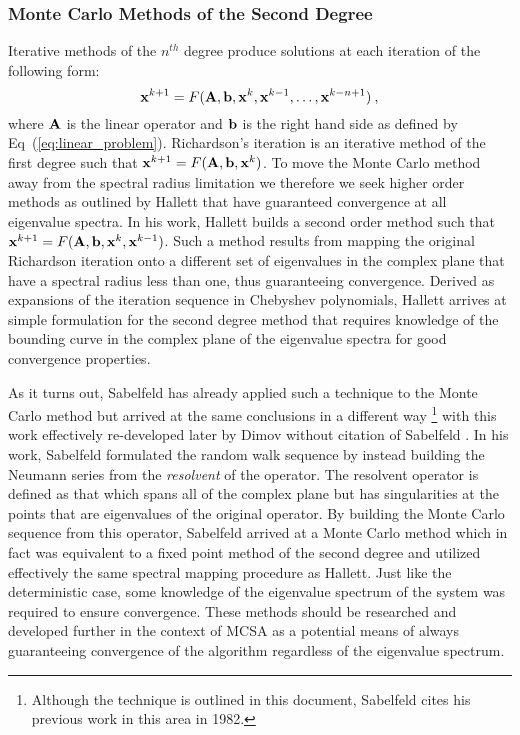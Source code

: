 \subsubsection{Monte Carlo Methods of the Second Degree}
\label{subsubsec:2_degree_mc}

Iterative methods of the $n^{th}$ degree produce solutions at each
iteration of the following form:
\begin{equation}
  \mathbf{x}^{k+1} = F(\mathbf{A},\mathbf{b},\mathbf{x}^{k},\mathbf{x}^{k-1},\dots,\mathbf{x}^{k-n+1})\:,
\label{eq:nth_degree_iter}
\end{equation}
where $\mathbf{A}$ is the linear operator and $\mathbf{b}$ is the right hand
side as defined by Eq~(\ref{eq:linear_problem}). Richardson's
iteration is an iterative method of the first degree such that
$\mathbf{x}^{k+1} = F(\mathbf{A},\mathbf{b},\mathbf{x}^{k})$. To move the Monte Carlo
method away from the spectral radius limitation we therefore we seek
higher order methods as outlined by Hallett
\cite{hughes_hallett_second-order_1984} that have guaranteed
convergence at all eigenvalue spectra. In his work, Hallett builds a
second order method such that $\mathbf{x}^{k+1} =
F(\mathbf{A},\mathbf{b},\mathbf{x}^{k},\mathbf{x}^{k-1})$. Such a method results from
mapping the original Richardson iteration onto a different set of
eigenvalues in the complex plane that have a spectral radius less than
one, thus guaranteeing convergence. Derived as expansions of the
iteration sequence in Chebyshev polynomials, Hallett arrives at simple
formulation for the second degree method that requires knowledge of
the bounding curve in the complex plane of the eigenvalue spectra for
good convergence properties.

As it turns out, Sabelfeld has already applied such a technique to the
Monte Carlo method but arrived at the same conclusions in a different
way \cite{sabelfeld_sparsified_2009}\footnote{Although the technique
  is outlined in this document, Sabelfeld cites his previous work in
  this area in 1982.} with this work effectively re-developed later by
Dimov without citation of Sabelfeld
\cite{dimov_parallel_2001,dimov_new_1998}. In his work, Sabelfeld
formulated the random walk sequence by instead building the Neumann
series from the \textit{resolvent} of the operator. The resolvent
operator is defined as that which spans all of the complex plane but
has singularities at the points that are eigenvalues of the original
operator. By building the Monte Carlo sequence from this operator,
Sabelfeld arrived at a Monte Carlo method which in fact was equivalent
to a fixed point method of the second degree and utilized effectively
the same spectral mapping procedure as Hallett. Just like the
deterministic case, some knowledge of the eigenvalue spectrum of the
system was required to ensure convergence. These methods should be
researched and developed further in the context of MCSA as a potential
means of always guaranteeing convergence of the algorithm regardless
of the eigenvalue spectrum.

